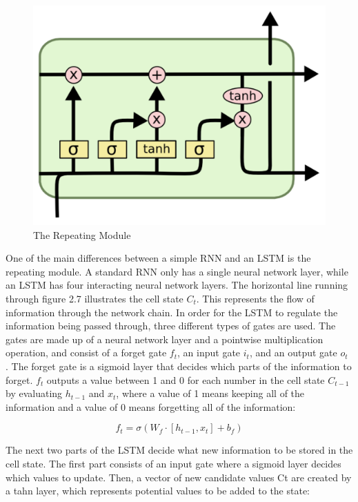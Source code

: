 \indent\newline 
\begin{figure}[H]
\centering
\includegraphics [scale=0.40,angle=360]{figures/module.png}
\caption{The Repeating Module \cite{olah}}
\label{fig:module}
\end{figure}

\indent\newline 
One of the main differences between a simple RNN and an LSTM is the repeating module. A standard RNN only has a single neural network layer, while an LSTM has four interacting neural network layers. The horizontal line running through figure 2.7 illustrates the cell state $C_{t}$. This represents the flow of information through the network chain. In order for the LSTM to regulate the information being passed through, three different types of gates are used. The gates are made up of a neural network layer and a pointwise multiplication operation, and consist of a forget gate $f_{t}$, an input gate $i_{t}$, and an output gate $o_{t}$ \cite{olah}. The forget gate is a sigmoid layer that decides which parts of the information to forget. $f_{t}$ outputs a value between 1 and 0 for each number in the cell state $C_{t-1}$ by evaluating $h_{t-1}$ and $x_{t}$, where a value of 1 means keeping all of the information and a value of 0 means forgetting all of the information:

\begin{equation}
f_{t} = \sigma(W_{f} \cdot[h_{t-1},x_{t}] + b_{f})
\end{equation} 

\indent\newline 
The next two parts of the LSTM decide what new information to be stored in the cell state. The first part consists of an input gate where a sigmoid layer decides which values to update\cite{olah}. Then, a vector of new candidate values Ct are created by a tahn layer, which represents potential values to be added to the state:

